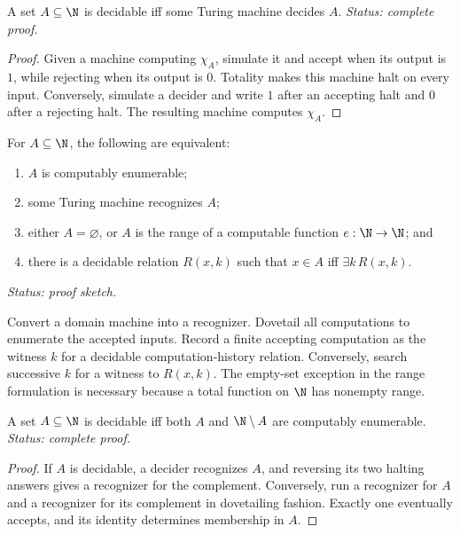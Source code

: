 \begin{lemma}
A set \(A\subseteq\N\) is decidable iff some Turing machine decides \(A\).
\textit{Status: complete proof.}
\end{lemma}

\begin{proof}
Given a machine computing \(\chi_A\), simulate it and accept when its output is
\(1\), while rejecting when its output is \(0\).  Totality makes this machine
halt on every input.  Conversely, simulate a decider and write \(1\) after an
accepting halt and \(0\) after a rejecting halt.  The resulting machine
computes \(\chi_A\).
\end{proof}

\begin{theorem}
For \(A\subseteq\N\), the following are equivalent:
\begin{enumerate}
  \item \(A\) is computably enumerable;
  \item some Turing machine recognizes \(A\);
  \item either \(A=\varnothing\), or \(A\) is the range of a computable
        function \(e:\N\to\N\); and
  \item there is a decidable relation \(R(x,k)\) such that
        \(x\in A\) iff \(\exists k\,R(x,k)\).
\end{enumerate}
\textit{Status: proof sketch.}
\end{theorem}

\begin{proofplan}
Convert a domain machine into a recognizer.  Dovetail all computations to
enumerate the accepted inputs.  Record a finite accepting computation as the
witness \(k\) for a decidable computation-history relation.  Conversely,
search successive \(k\) for a witness to \(R(x,k)\).  The empty-set exception
in the range formulation is necessary because a total function on \(\N\) has
nonempty range.
\end{proofplan}

\begin{theorem}
A set \(A\subseteq\N\) is decidable iff both \(A\) and
\(\N\setminus A\) are computably enumerable.
\textit{Status: complete proof.}
\end{theorem}

\begin{proof}
If \(A\) is decidable, a decider recognizes \(A\), and reversing its
two halting answers gives a recognizer for the complement.  Conversely, run a
recognizer for \(A\) and a recognizer for its complement in dovetailing fashion.
Exactly one eventually accepts, and its identity determines membership in
\(A\).
\end{proof}

